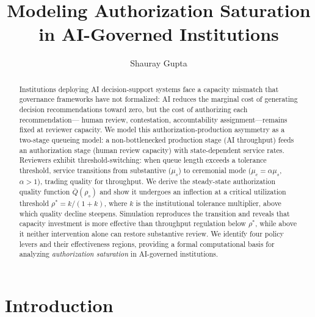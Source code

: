 \documentclass[runningheads]{llncs}
\begin{document}
\title{Modeling Authorization Saturation in AI-Governed Institutions}

\author{Shauray Gupta}


\maketitle

\begin{abstract}
Institutions deploying AI decision-support systems face a capacity mismatch that
governance frameworks have not formalized: AI reduces the marginal cost of generating
decision recommendations toward zero, but the cost of authorizing each recommendation---%
human review, contestation, accountability assignment---remains fixed at reviewer
capacity. We model this authorization-production asymmetry as a two-stage queueing model:
a non-bottlenecked production stage (AI throughput) feeds an authorization stage (human
review capacity) with state-dependent service rates. Reviewers exhibit threshold-switching:
when queue length exceeds a tolerance threshold, service transitions from
substantive ($\mu_s$) to ceremonial mode ($\mu_c = \alpha\mu_s$, $\alpha > 1$), trading
quality for throughput. We derive the steady-state authorization quality function
$\bar{Q}(\rho_s)$ and show it undergoes an inflection at a critical utilization
threshold $\rho^* = k/(1+k)$, where $k$ is the institutional tolerance multiplier,
above which quality decline steepens.
Simulation reproduces the transition and reveals that capacity investment is more
effective than throughput regulation below $\rho^*$, while above it neither
intervention alone can restore substantive review. We identify four policy levers
and their effectiveness regions, providing a formal computational
basis for analyzing \emph{authorization saturation} in AI-governed institutions.
\end{abstract}


\section{Introduction}
\label{sec:intro}
\end{document}
